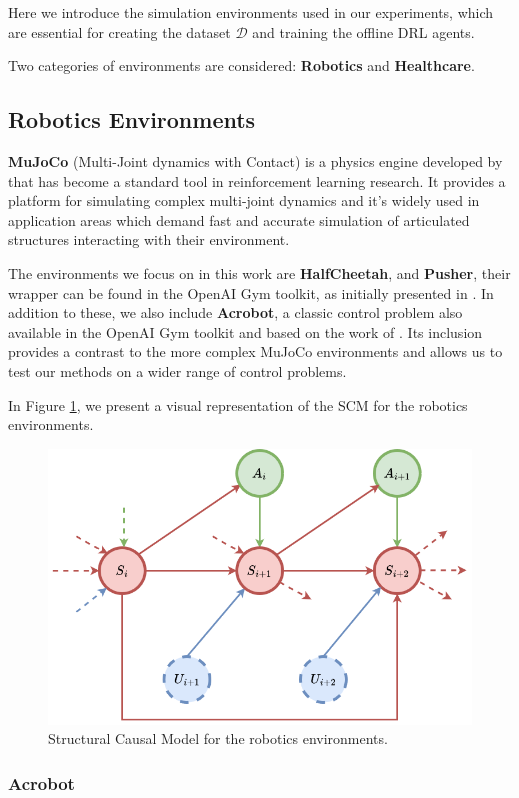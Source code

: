 Here we introduce the simulation environments used in our experiments,
which are essential for creating the dataset \( \mathcal{D} \) and
training the offline DRL agents.

Two categories of environments are considered: \textbf{Robotics} and
\textbf{Healthcare}.

\subsection{Robotics Environments}

\textbf{MuJoCo} (Multi-Joint dynamics with Contact)
is a physics engine developed by \cite{todorov2012mujoco}
that has become a standard tool in reinforcement learning research.
It provides a platform for simulating complex multi-joint dynamics
and it's widely used in application areas which
demand fast and accurate simulation of articulated
structures interacting with their environment.

The environments we focus on in this work are
\textbf{HalfCheetah}, and \textbf{Pusher},
their wrapper can be found
in the OpenAI Gym toolkit, as initially
presented in \cite{brockman2016openaigym}.
In addition to these, we also include \textbf{Acrobot},
a classic control problem also available in the OpenAI Gym
toolkit and based on the work of \cite{sutton1998}.
Its inclusion provides
a contrast to the more complex MuJoCo environments and
allows us to test our methods on a wider range of
control problems.

In Figure \ref{fig:robotics}, we present a visual representation
of the SCM for the robotics environments.

\begin{figure}[h]
    \centering
    \includegraphics[width=.6\textwidth]{figures/ch4/SCM-rob.png}
    \caption{Structural Causal Model for the robotics environments.}
    \label{fig:robotics}
\end{figure}

\subsubsection{Acrobot}

